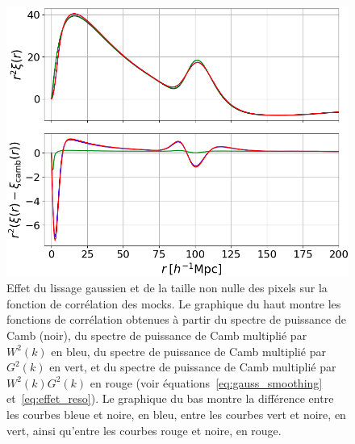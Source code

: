 \begin{figure}
  \centering
  \includegraphics[scale=0.38]{xi_smoothing}
  \caption{Effet du lissage gaussien et de la taille non nulle des pixels sur la fonction de corrélation des mocks. Le graphique du haut montre les fonctions de corrélation obtenues à partir du spectre de puissance de Camb (noir), du spectre de puissance de Camb multiplié par $W^2(k)$ en bleu, du spectre de puissance de Camb multiplié par $G^2(k)$ en vert, et du spectre de puissance de Camb multiplié par $W^2(k)G^2(k)$ en rouge (voir équations~\ref{eq:gauss_smoothing} et~\ref{eq:effet_reso}). Le graphique du bas montre la différence entre les courbes bleue et noire, en bleu, entre les courbes vert et noire, en vert, ainsi qu'entre les courbes rouge et noire, en rouge.}
  \label{fig:xi_smoothing}
\end{figure}
